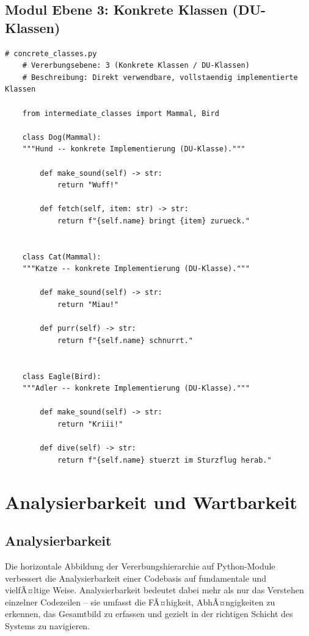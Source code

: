 ﻿\documentclass[a4paper,12pt]{article}
\begin{document}
\subsection{Modul Ebene 3: Konkrete Klassen (DU-Klassen)}

\begin{lstlisting}[caption={concrete\_classes.py -- Ebene 3 der Vererbungshierarchie (DU-Klassen)},
	label={lst:concrete}]
	# concrete_classes.py
	# Vererbungsebene: 3 (Konkrete Klassen / DU-Klassen)
	# Beschreibung: Direkt verwendbare, vollstaendig implementierte Klassen
	
	from intermediate_classes import Mammal, Bird
	
	class Dog(Mammal):
	"""Hund -- konkrete Implementierung (DU-Klasse)."""
	
		def make_sound(self) -> str:
			return "Wuff!"
	
		def fetch(self, item: str) -> str:
			return f"{self.name} bringt {item} zurueck."
	
	
	class Cat(Mammal):
	"""Katze -- konkrete Implementierung (DU-Klasse)."""
	
		def make_sound(self) -> str:
			return "Miau!"
	
		def purr(self) -> str:
			return f"{self.name} schnurrt."
	
	
	class Eagle(Bird):
	"""Adler -- konkrete Implementierung (DU-Klasse)."""
	
		def make_sound(self) -> str:
			return "Kriii!"
	
		def dive(self) -> str:
			return f"{self.name} stuerzt im Sturzflug herab."
\end{lstlisting}

\section{Analysierbarkeit und Wartbarkeit}

\subsection{Analysierbarkeit}

Die horizontale Abbildung der Vererbungshierarchie auf Python-Module verbessert
die Analysierbarkeit einer Codebasis auf fundamentale und vielfÃ¤ltige Weise.
Analysierbarkeit bedeutet dabei mehr als nur das Verstehen einzelner Codezeilen --
sie umfasst die FÃ¤higkeit, AbhÃ¤ngigkeiten zu erkennen, das Gesamtbild zu erfassen
und gezielt in der richtigen Schicht des Systems zu navigieren.
\end{document}
